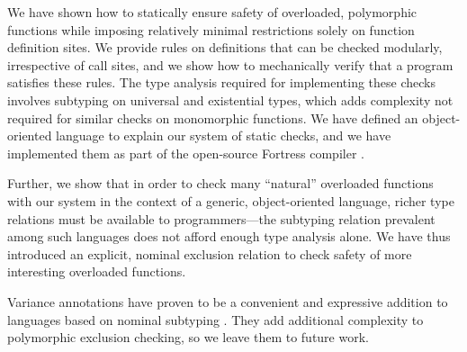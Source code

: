 We have shown how to statically ensure safety of overloaded, polymorphic functions while imposing relatively minimal restrictions solely on function definition sites. We provide rules on definitions that can be checked modularly, irrespective of call sites, and we show how to mechanically verify that a program satisfies these rules. The type analysis required for implementing these checks involves subtyping on universal and existential types, which adds complexity not required for similar checks on monomorphic functions. We have defined an object-oriented language to explain our system of static checks, and we have implemented them as part of the open-source Fortress compiler \cite{Fortress}.

Further, we show that in order to check many ``natural'' overloaded functions with our system in the context of a generic, object-oriented language, richer type relations must be available to programmers---the subtyping relation prevalent among such languages does not afford enough type analysis alone. We have thus introduced an explicit, nominal exclusion relation to check safety of more interesting overloaded functions.

Variance annotations have proven to be a convenient and expressive addition to languages based on nominal subtyping \cite{bourdoncle97,kennedy07,scala}. They add additional complexity to polymorphic exclusion checking, so we leave them to future work.
